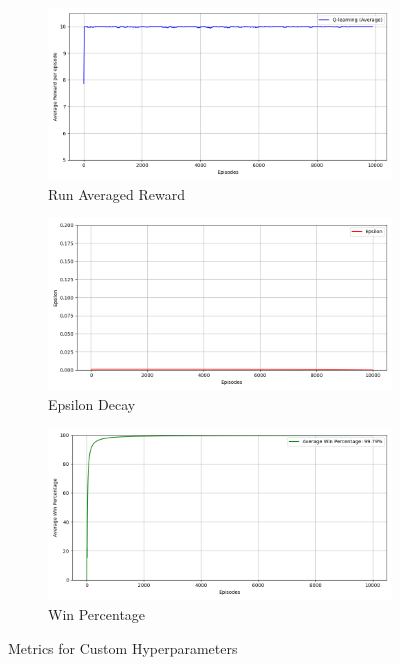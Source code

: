 \documentclass[a4paper,9pt]{scrartcl}
\begin{document}
\begin{figure}[H]
\centering
\begin{subfigure}[b]{0.32\textwidth}
\includegraphics[width=\textwidth]{images/q_learning_rewards_avg(3).png}
\caption{Run Averaged Reward}
\label{fig:set3_rewards}
\end{subfigure}
\hfill
\begin{subfigure}[b]{0.32\textwidth}
\includegraphics[width=\textwidth]{images/q_learning_epsilon_avg(3).png}
\caption{Epsilon Decay}
\label{fig:set3_epsilon}
\end{subfigure}
\hfill
\begin{subfigure}[b]{0.32\textwidth}
\includegraphics[width=\textwidth]{images/q_learning_win_percentage_avg(3).png}
\caption{Win Percentage}
\label{fig:set3_winpercent}
\end{subfigure}
\caption{Metrics for Custom Hyperparameters}
\label{fig:set3_metrics}
\end{figure}
\end{document}
